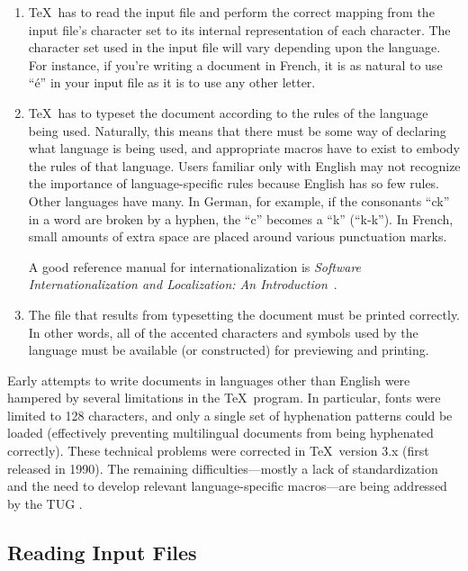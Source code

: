 \begin{enumerate}
\item \TeX\ has to read the input file and perform the correct mapping from
the input file's character set to its internal representation of each
character.  The character
set used in the input file will vary depending upon the language. For instance,
if you're
writing a document in French, it 
is as natural to use ``\'e'' in your
input file as it is to use any other letter.

\item \TeX\ has to typeset the document according to the rules of the
language being used.  Naturally, this means that there must be some
way of declaring what language is being used, and appropriate macros
have to exist to embody the rules of that language.  Users familiar only
with English may not recognize the importance of language-specific
rules because English has so few rules.  Other languages have many.
In German, for 
example, if the consonants ``ck'' in a word are broken
by a hyphen, the ``c'' becomes a ``k'' (``k-k'').  
In French, small
amounts of extra
space are placed around various punctuation marks.

A good reference manual for internationalization is
\textit{Software Internationalization and Localization: An 
Introduction}~\cite{eu:international}.

\item The  file that results from typesetting the document must
be printed correctly.  In other words, all of the accented characters and
symbols used by the language must be available (or constructed) for
previewing and printing.
\end{enumerate}

Early attempts to write documents in languages other than English were
hampered by several limitations in the \TeX\ program.  In particular, fonts
were limited to 128 characters, and only a single set of hyphenation patterns
could be loaded (effectively preventing multilingual documents from being
hyphenated correctly).  These technical problems were corrected in \TeX\
version 3.x (first released in 1990).  The remaining difficulties---mostly
a lack of standardization and the need to develop relevant language-specific
macros---are being addressed by the TUG .

\subsection{Reading Input Files}

